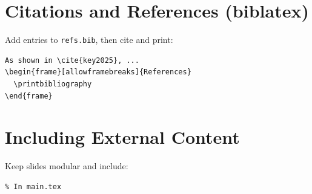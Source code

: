 \documentclass[11pt]{article}
\begin{document}
\section*{Citations and References (biblatex)}
Add entries to \texttt{refs.bib}, then cite and print:
\begin{verbatim}
As shown in \cite{key2025}, ...
\begin{frame}[allowframebreaks]{References}
  \printbibliography
\end{frame}
\end{verbatim}

\section*{Including External Content}
Keep slides modular and include:
\begin{verbatim}
% In main.tex


\end{verbatim}
\end{document}
